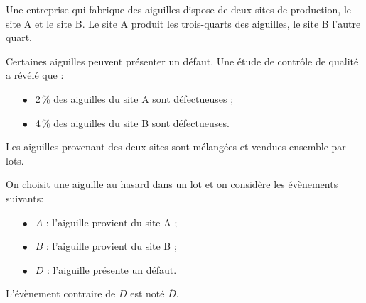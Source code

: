 
\medskip

Une entreprise qui fabrique des aiguilles dispose de deux sites de production, le site A et le site B.
Le site A produit les trois-quarts des aiguilles, le site B l'autre quart. 

Certaines aiguilles peuvent présenter un défaut. Une étude de contrôle de qualité a révélé que :

\setlength\parindent{9mm}
\begin{itemize}
\item[$\bullet~~$] 2\,\% des aiguilles du site A sont défectueuses ;
\item[$\bullet~~$] 4\,\% des aiguilles du site B sont défectueuses.
\end{itemize}
\setlength\parindent{0mm}
\medskip

Les aiguilles provenant des deux sites sont mélangées et vendues ensemble par lots. 

On choisit une aiguille au hasard dans un lot et on considère les évènements suivants:

\setlength\parindent{9mm}
\begin{itemize}
\item[$\bullet~~$]$A$ : l'aiguille provient du site A ; 
\item[$\bullet~~$]$B$ : l'aiguille provient du site B ;
\item[$\bullet~~$]$D$ : l'aiguille présente un défaut.
\end{itemize}
\setlength\parindent{0mm}

L'évènement contraire de $D$ est noté $\overline{D}$.

\medskip

